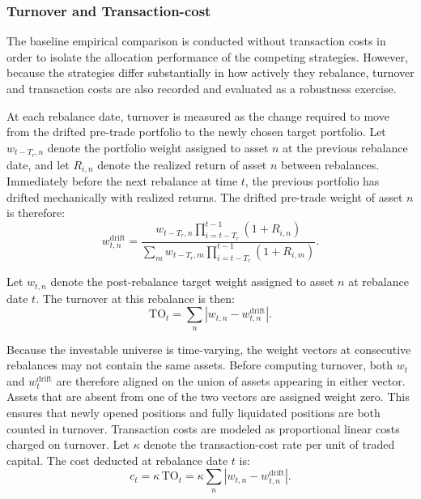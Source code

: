 \documentclass[12pt]{article}
\begin{document}
\subsubsection{Turnover and Transaction-cost}
\label{sec:turnover-costs}

The baseline empirical comparison is conducted without transaction costs in order to isolate the allocation performance of the competing strategies. However, because the strategies differ substantially in how actively they rebalance, turnover and transaction costs are also recorded and evaluated as a robustness exercise. 

At each rebalance date, turnover is measured as the change required to move from the drifted pre-trade portfolio to the newly chosen target portfolio. Let $w_{t-T_r,n}$ denote the portfolio weight assigned to asset $n$ at the previous rebalance date, and let $R_{i,n}$ denote the realized return of asset $n$ between rebalances. Immediately before the next rebalance at time $t$, the previous portfolio has drifted mechanically with realized returns. The drifted pre-trade weight of asset $n$ is therefore:
\begin{equation}
w^{\mathrm{drift}}_{t,n}
=
\frac{
w_{t-T_r,n}
\prod_{i=t-T_r}^{t-1}(1+R_{i,n})
}{
\sum_{m}
w_{t-T_r,m}
\prod_{i=t-T_r}^{t-1}(1+R_{i,m})
}.
\label{eq:drifted_weight_design}
\end{equation}

Let $w_{t,n}$ denote the post-rebalance target weight assigned to asset $n$ at rebalance date $t$. The turnover at this rebalance is then:
\begin{equation}
\mathrm{TO}_t
=
\sum_{n}
\left|
w_{t,n}
-
w^{\mathrm{drift}}_{t,n}
\right|.
\label{eq:turnover_design}
\end{equation}

Because the investable universe is time-varying, the weight vectors at consecutive rebalances may not contain the same assets. Before computing turnover, both $w_t$ and $w_t^{\mathrm{drift}}$ are therefore aligned on the union of assets appearing in either vector. Assets that are absent from one of the two vectors are assigned weight zero. This ensures that newly opened positions and fully liquidated positions are both counted in turnover. Transaction costs are modeled as proportional linear costs charged on turnover. Let $\kappa$ denote the transaction-cost rate per unit of traded capital. The cost deducted at rebalance date $t$ is:
\begin{equation}
c_t
=
\kappa \, \mathrm{TO}_t
=
\kappa
\sum_n
\left|
w_{t,n}
-
w^{\mathrm{drift}}_{t,n}
\right|.
\label{eq:transaction_cost_design}
\end{equation}
\end{document}
